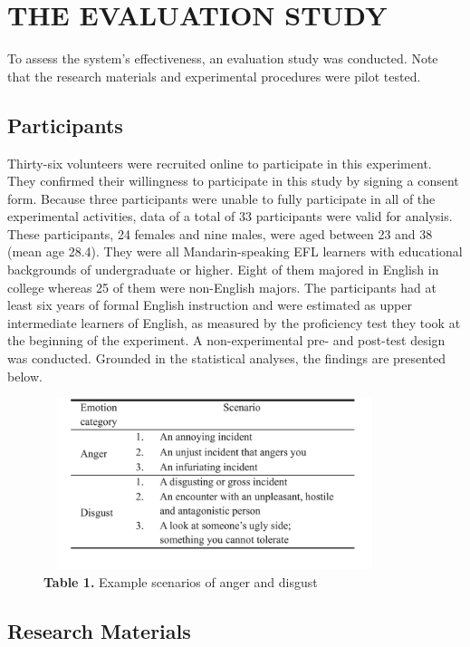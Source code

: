 \documentclass[a4paper,12pt,oneside]{article}
\let\counterwithin\relax
\begin{document}
\newpage
\section{THE EVALUATION STUDY}
To assess the system’s effectiveness, an evaluation study was conducted. Note that the research materials and experimental procedures were pilot tested. 

\subsection{Participants}

Thirty-six volunteers were recruited online to participate in this experiment. They confirmed their willingness to participate in this study by signing a consent form. Because three participants were unable to fully participate in all of the experimental activities, data of a total of 33 participants were valid for analysis. These participants, 24 females and nine males, were aged between 23 and 38 (mean age 28.4). They were all Mandarin-speaking EFL learners with educational backgrounds of undergraduate or higher. Eight of them majored in English in college whereas 25 of them were non-English majors. The participants had at least six years of formal English instruction and were estimated as upper intermediate learners of English, as measured by the proficiency test they took at the beginning of the experiment. A non-experimental pre- and post-test design was conducted. Grounded in the statistical analyses, the findings are presented below. 

\begin{figure}[H]
\includegraphics[height=5cm,width=10cm]{Table1.png}
\centering
\caption{\textbf{Table 1.} Example scenarios of anger and disgust}
\end{figure}

\subsection{Research Materials}
\end{document}
